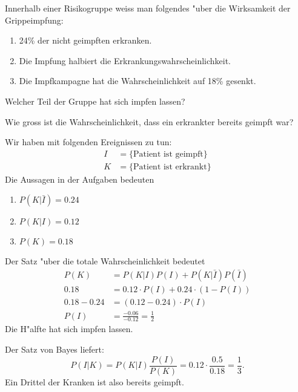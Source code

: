 Innerhalb einer Risiko\-gruppe weiss man folgendes "uber die Wirksamkeit
der Grippe\-impfung:
\begin{enumerate}
\item 24\% der nicht geimpften erkranken.
\item Die Impfung halbiert die Erkrankungswahrscheinlichkeit.
\item Die Impfkampagne hat die Wahrscheinlichkeit
auf 18\% gesenkt.
\end{enumerate}
\begin{teilaufgaben}
\item Welcher Teil der Gruppe hat sich impfen lassen?
\item Wie gross ist die Wahrscheinlichkeit, dass ein erkrankter
bereits geimpft war?
\end{teilaufgaben}

\begin{loesung}
Wir haben mit folgenden Ereignissen zu tun:
\begin{align*}
I&=\{\text{Patient ist geimpft}\}\\
K&=\{\text{Patient ist erkrankt}\}
\end{align*}
Die Aussagen in der Aufgaben bedeuten
\begin{enumerate}
\item $P(K|\bar I)=0.24$
\item $P(K|I)=0.12$
\item $P(K)=0.18$
\end{enumerate}
\begin{teilaufgaben}
\item
Der Satz "uber die totale Wahrscheinlichkeit bedeutet
\begin{align*}
P(K)&=P(K|I)P(I)+P(K|\bar I)P(\bar I)
\\
0.18&=0.12\cdot P(I)+0.24\cdot (1-P(I))
\\
0.18-0.24&=(0.12-0.24)\cdot P(I)
\\
P(I)&=\frac{-0.06}{-0.12}=\frac12
\end{align*}
Die H"alfte hat sich impfen lassen.
\item
Der Satz von Bayes liefert:
\[
P(I|K)=P(K|I)\frac{P(I)}{P(K)}=0.12\cdot\frac{0.5}{0.18}=\frac13.
\]
Ein Drittel der Kranken ist also bereits geimpft.
\end{teilaufgaben}
\end{loesung}


